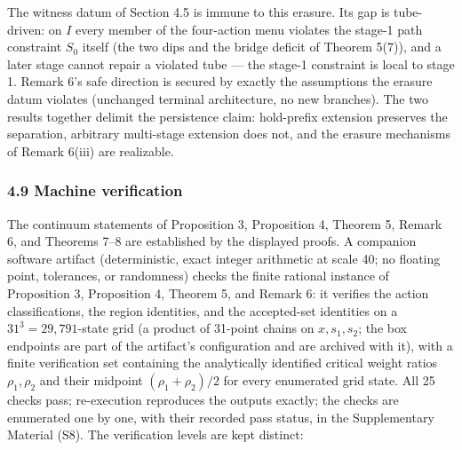 \documentclass[11pt]{article}
\begin{document}
The witness datum of Section 4.5 is immune to this erasure. Its gap is
tube-driven: on \(I\) every member of the four-action menu violates the
stage-1 path constraint \(S_0\) itself (the two dips and the bridge
deficit of Theorem 5(7)), and a later stage cannot repair a violated
tube --- the stage-1 constraint is local to stage 1. Remark 6's safe
direction is secured by exactly the assumptions the erasure datum
violates (unchanged terminal architecture, no new branches). The two
results together delimit the persistence claim: hold-prefix extension
preserves the separation, arbitrary multi-stage extension does not, and
the erasure mechanisms of Remark 6(iii) are realizable.

\subsubsection{4.9 Machine verification}\label{machine-verification}

The continuum statements of Proposition 3, Proposition 4, Theorem 5,
Remark 6, and Theorems 7--8 are established by the displayed proofs. A
companion software artifact (deterministic, exact integer arithmetic at
scale 40; no floating point, tolerances, or randomness) checks the
finite rational instance of Proposition 3, Proposition 4, Theorem 5, and
Remark 6: it verifies the action classifications, the region identities,
and the accepted-set identities on a \(31^3 = 29{,}791\)-state grid (a
product of 31-point chains on \(x, s_1, s_2\); the box endpoints are
part of the artifact's configuration and are archived with it), with a
finite verification set containing the analytically identified critical
weight ratios \(\rho_1, \rho_2\) and their midpoint
\((\rho_1 + \rho_2)/2\) for every enumerated grid state. All 25 checks
pass; re-execution reproduces the outputs exactly; the checks are
enumerated one by one, with their recorded pass status, in the
Supplementary Material (S8). The verification levels are kept distinct:
\end{document}
